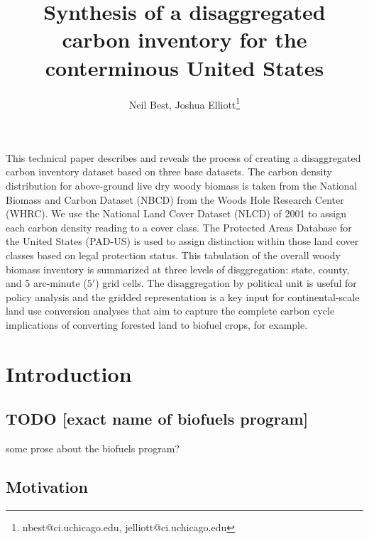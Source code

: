 \documentclass[11pt]{article}
\title{Synthesis of a disaggregated carbon inventory for the conterminous United States}
\author{Neil Best, Joshua Elliott\thanks{nbest@ci.uchicago.edu, jelliott@ci.uchicago.edu}}
\date{}
\begin{document}
\maketitle





This technical paper describes and reveals the process of creating a
disaggregated carbon inventory dataset based on three base datasets.
The carbon density distribution for above-ground live dry woody
biomass is taken from the National Biomass and Carbon Dataset (NBCD)
from the Woods Hole Research Center (WHRC).  We use the National Land
Cover Dataset (NLCD) of 2001 to assign each carbon density reading to
a cover class.  The Protected Areas Database for the United States
(PAD-US) is used to assign distinction within those land cover classes
based on legal protection status.  This tabulation of the overall
woody biomass inventory is summarized at three levels of
disggregation: state, county, and 5 arc-minute ($5'$) grid cells.  The
disaggregation by political unit is useful for policy analysis and the
gridded representation is a key input for continental-scale land use
conversion analyses that aim to capture the complete carbon cycle
implications of converting forested land to biofuel crops, for
example.
\tableofcontents
\listoftables
\listoffigures

\section{Introduction}
\label{sec-1}
\subsection{\textbf{TODO} [exact name of biofuels program]}
\label{sec-1-1}


some prose about the biofuels program?
\subsection{Motivation}
\label{sec-1-2}
\end{document}
